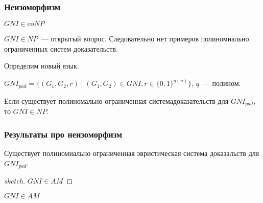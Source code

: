 \begin{frame}
    \frametitle{Неизоморфизм}

    $GNI \in coNP$
    
    $GNI \in NP$~--- открытый вопрос. Следовательно нет примеров полиномиально
    ограниченных систем доказательств.

    Определим новый язык.

    \begin{definition}
        $GNI_{pad} = \{(G_1, G_2, r) \mid (G_1, G_2) \in GNI,
        r \in \{0, 1\}^{q(n)}\}$, $q$~--- полином.
    \end{definition}

    \begin{lemma}
        Если существует полиномально ограниченная системадоказательств для
        $GNI_{pad}$, то $GNI \in NP$.
    \end{lemma}
\end{frame}

\begin{frame}
    \frametitle{Результаты про неизоморфизм}

    \begin{theorem}
        Существует полиномиально ограниченная эвристическая система доказальств для
        $GNI_{pad}$.
    \end{theorem}

    \begin{proof}[sketch]
        $GNI \in AM$
    \end{proof}
    $GNI \in AM$
\end{frame}